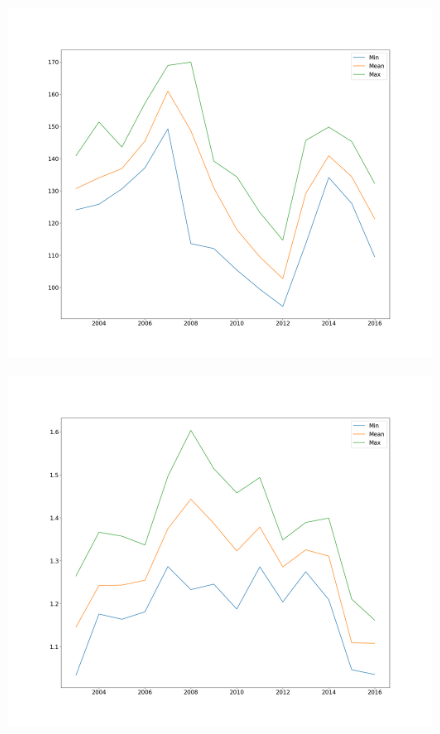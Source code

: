 \documentclass[a4paper]{article}
\begin{document}
\begin{figure}
\begin{minipage}{.5\textwidth}
	\label{fig:4}
	\end{minipage}
	\begin{minipage}{.5\textwidth}
	\centering
	\includegraphics[width=\linewidth]{Figures/stats_jpy}
	\label{fig:5}
	\end{minipage}%
	\begin{minipage}{.5\textwidth}
	\centering
	\includegraphics[width=\linewidth]{Figures/stats_usd}
	\label{fig:6}
	\end{minipage}
\end{figure}
\end{document}
